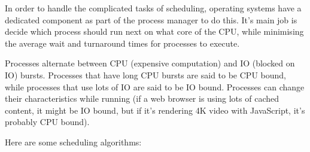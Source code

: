 In order to handle the complicated tasks of scheduling, operating systems have a
dedicated component as part of the process manager to do this. It's main job is
decide which process should run next on what core of the CPU, while minimising
the average wait and turnaround times for processes to execute.

Processes alternate between CPU (expensive computation) and IO (blocked on IO)
bursts. Processes that have long CPU bursts are said to be CPU bound, while
processes that use lots of IO are said to be IO bound. Processes can change
their characteristics while running (if a web browser is using lots of cached
content, it might be IO bound, but if it's rendering 4K video with JavaScript,
it's probably CPU bound).

Here are some scheduling algorithms:

